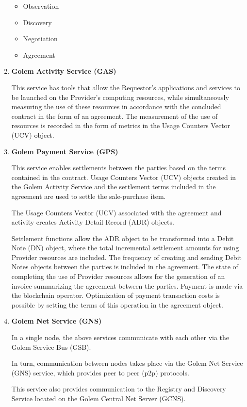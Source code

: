 \begin{enumerate}
\begin{itemize}
\item  Observation
\item  Discovery
\item  Negotiation
\item  Agreement
\end{itemize}

\item {\bf Golem Activity Service (GAS)}

This service has tools that allow the Requestor's applications and services to be launched on the Provider's computing resources,
while simultaneously measuring the use of these resources in accordance with the concluded contract in the form of an agreement. The measurement of the use of
resources is recorded in the form of metrics in the Usage Counters Vector (UCV) object.

\item {\bf Golem Payment Service (GPS)}

This service enables settlements between the parties based on the terms contained in the contract. Usage Counters Vector (UCV) objects created in the Golem Activity Service and the settlement terms included in the agreement are used to settle the sale-purchase item.

The Usage Counters Vector (UCV) associated with the agreement and activity creates Activity Detail Record (ADR) objects.

Settlement functions allow the ADR object to be transformed into a Debit Note (DN) object, where the total incremental settlement amounts for using Provider resources are included. The frequency of creating and sending Debit Notes objects between the parties is included in the agreement. The state of completing the use of Provider resources allows for the generation of an invoice summarizing the agreement between the parties. Payment is made via the blockchain operator. Optimization of payment transaction costs is
possible by setting the terms of this operation in the agreement object.

\item {\bf Golem Net Service (GNS)}

In a single node, the above services communicate with each other via the Golem Service Bus (GSB).

In turn, communication between nodes takes place via the Golem Net Service (GNS) service, which provides peer to peer (p2p) protocols.

This service also provides communication to the Registry and Discovery Service located on the Golem Central Net Server (GCNS).


\end{enumerate}
